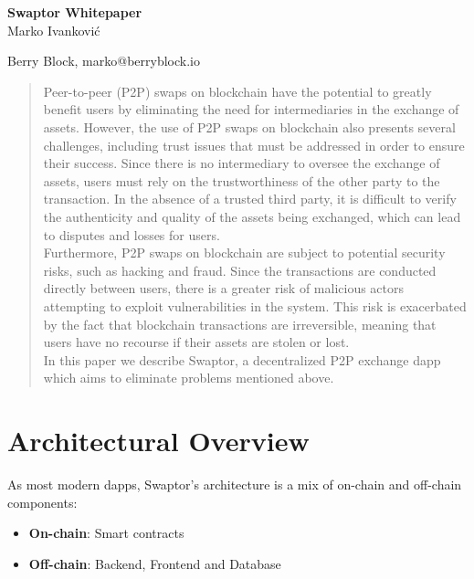 \documentclass[12pt]{article}
\begin{document}
\baselineskip 11pt


\begin{center}
  \textbf{\Large Swaptor Whitepaper} \\

  \vspace{1.5cc}
  { \sc Marko Ivanković}\\

  \vspace{0.3 cm}

  {\small Berry Block, marko@berryblock.io}
\end{center}
\vspace{1.5cc}

\begin{abstract}
  \noindent  Peer-to-peer (P2P) swaps on blockchain have the potential to greatly benefit users by eliminating the need for intermediaries in the exchange of assets. However, the use of P2P swaps on blockchain also presents several challenges, including trust issues that must be addressed in order to ensure their success.  Since there is no intermediary to oversee the exchange of assets, users must rely on the trustworthiness of the other party to the transaction. In the absence of a trusted third party, it is difficult to verify the authenticity and quality of the assets being exchanged, which can lead to disputes and losses for users.
  \\ \indent Furthermore, P2P swaps on blockchain are subject to potential security risks, such as hacking and fraud. Since the transactions are conducted directly between users, there is a greater risk of malicious actors attempting to exploit vulnerabilities in the system. This risk is exacerbated by the fact that blockchain transactions are irreversible, meaning that users have no recourse if their assets are stolen or lost.
  \\ \indent In this paper we describe Swaptor, a decentralized P2P exchange dapp which aims to eliminate problems mentioned above.

  \vspace{0.95cc}
\end{abstract}

\newpage

\tableofcontents

\newpage

\section{Architectural Overview} \label{form}
\indent As most modern dapps, Swaptor's architecture is a mix of on-chain and off-chain components:
\begin{itemize}
  \item \textbf{On-chain}: Smart contracts
  \item \textbf{Off-chain}: Backend, Frontend and Database
\end{itemize}
\end{document}
